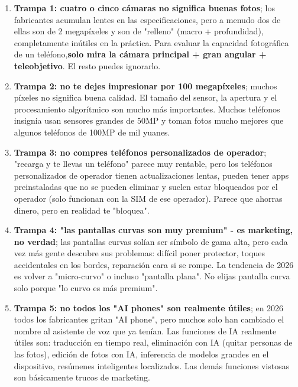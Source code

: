 \begin{enumerate}
  \item \textbf{Trampa 1: cuatro o cinco cámaras no significa buenas fotos}; los fabricantes acumulan lentes en las especificaciones, pero a menudo dos de ellas son de 2 megapíxeles y son de "relleno" (macro + profundidad), completamente inútiles en la práctica. Para evaluar la capacidad fotográfica de un teléfono,\textbf{solo mira la cámara principal + gran angular + teleobjetivo}. El resto puedes ignorarlo.
  \item \textbf{Trampa 2: no te dejes impresionar por 100 megapíxeles}; muchos píxeles no significa buena calidad. El tamaño del sensor, la apertura y el procesamiento algorítmico son mucho más importantes. Muchos teléfonos insignia usan sensores grandes de 50MP y toman fotos mucho mejores que algunos teléfonos de 100MP de mil yuanes.
  \item \textbf{Trampa 3: no compres teléfonos personalizados de operador}; "recarga y te llevas un teléfono" parece muy rentable, pero los teléfonos personalizados de operador tienen actualizaciones lentas, pueden tener apps preinstaladas que no se pueden eliminar y suelen estar bloqueados por el operador (solo funcionan con la SIM de ese operador). Parece que ahorras dinero, pero en realidad te "bloquea".
  \item \textbf{Trampa 4: "las pantallas curvas son muy premium" - es marketing, no verdad}; las pantallas curvas solían ser símbolo de gama alta, pero cada vez más gente descubre sus problemas: difícil poner protector, toques accidentales en los bordes, reparación cara si se rompe. La tendencia de 2026 es volver a "micro-curvo" o incluso "pantalla plana". No elijas pantalla curva solo porque "lo curvo es más premium".
  \item \textbf{Trampa 5: no todos los "AI phones" son realmente útiles}; en 2026 todos los fabricantes gritan "AI phone", pero muchos solo han cambiado el nombre al asistente de voz que ya tenían. Las funciones de IA realmente útiles son: traducción en tiempo real, eliminación con IA (quitar personas de las fotos), edición de fotos con IA, inferencia de modelos grandes en el dispositivo, resúmenes inteligentes localizados. Las demás funciones vistosas son básicamente trucos de marketing.
\end{enumerate}


